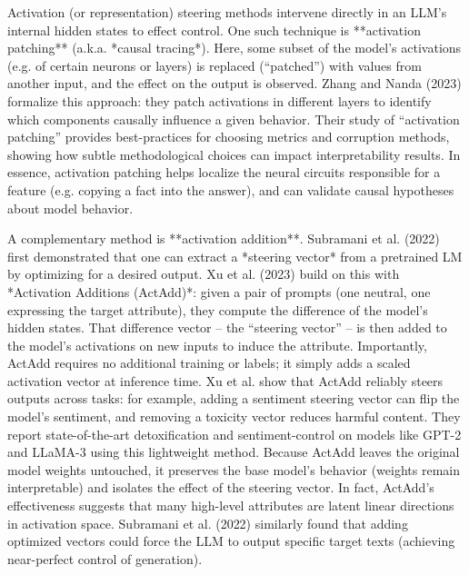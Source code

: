 Activation (or representation) steering methods intervene directly in an LLM’s internal hidden states to effect control.  One such technique is **activation patching** (a.k.a. *causal tracing*).  Here, some subset of the model’s activations (e.g. of certain neurons or layers) is replaced (“patched”) with values from another input, and the effect on the output is observed.  Zhang and Nanda (2023) formalize this approach: they patch activations in different layers to identify which components causally influence a given behavior.  Their study of “activation patching” provides best-practices for choosing metrics and corruption methods, showing how subtle methodological choices can impact interpretability results.  In essence, activation patching helps localize the neural circuits responsible for a feature (e.g. copying a fact into the answer), and can validate causal hypotheses about model behavior.

A complementary method is **activation addition**.  Subramani et al. (2022) first demonstrated that one can extract a *steering vector* from a pretrained LM by optimizing for a desired output.  Xu et al. (2023) build on this with *Activation Additions (ActAdd)*: given a pair of prompts (one neutral, one expressing the target attribute), they compute the difference of the model’s hidden states. That difference vector – the “steering vector” – is then added to the model’s activations on new inputs to induce the attribute.  Importantly, ActAdd requires no additional training or labels; it simply adds a scaled activation vector at inference time.  Xu et al. show that ActAdd reliably steers outputs across tasks: for example, adding a sentiment steering vector can flip the model’s sentiment, and removing a toxicity vector reduces harmful content. They report state-of-the-art detoxification and sentiment-control on models like GPT-2 and LLaMA-3 using this lightweight method.  Because ActAdd leaves the original model weights untouched, it preserves the base model’s behavior (weights remain interpretable) and isolates the effect of the steering vector.  In fact, ActAdd’s effectiveness suggests that many high-level attributes are latent linear directions in activation space. Subramani et al. (2022) similarly found that adding optimized vectors could force the LLM to output specific target texts (achieving near-perfect control of generation).

